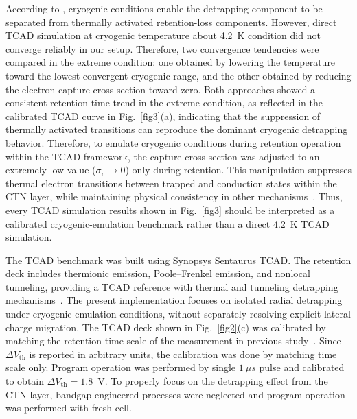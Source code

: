 \documentclass[journal,twoside,web]{ieeecolor}
\begin{document}
According to \cite{Refaldi.IRPS2025}, cryogenic conditions enable the detrapping component to be {separated from thermally activated retention-loss components}.
However, direct TCAD simulation at cryogenic temperature about 4.2~K condition did not converge reliably in our setup.
{Therefore, two convergence tendencies were compared in the extreme condition: one obtained by lowering the temperature toward the lowest convergent cryogenic range, and the other obtained by reducing the electron capture cross section toward zero.}
{Both approaches showed a consistent retention-time trend in the extreme condition, as reflected in the calibrated TCAD curve in Fig.~\ref{fig3}(a), indicating that the suppression of thermally activated transitions can reproduce the dominant cryogenic detrapping behavior.}
Therefore, to emulate cryogenic conditions during retention operation within the TCAD framework, the capture cross section was adjusted to an extremely low value ($\sigma_\mathrm{n} \rightarrow 0$) only during retention.
This manipulation suppresses thermal electron transitions between trapped and conduction states within the CTN layer, while maintaining physical consistency in other mechanisms~\cite{TCADmanual.2022}.
{Thus, every TCAD simulation results shown in \hbox{Fig.~\ref{fig3}} should be interpreted as a calibrated cryogenic-emulation benchmark rather than a direct 4.2~K TCAD simulation.}

{The TCAD benchmark was built using Synopsys Sentaurus TCAD.}
{The retention deck includes thermionic emission, Poole--Frenkel emission, and nonlocal tunneling, providing a TCAD reference with thermal and tunneling detrapping mechanisms~\hbox{\cite{TCADmanual.2022}}.}
{The present implementation focuses on isolated radial detrapping under cryogenic-emulation conditions, without separately resolving explicit lateral charge migration.}
The TCAD deck shown in Fig.~\ref{fig2}(c) was calibrated by matching the retention time scale of the measurement in previous study~\cite{Refaldi.IRPS2025}.
Since $\Delta V_\text{th}$ is reported in arbitrary units, the calibration was done by matching time scale only.
Program operation was performed by single $1~\mu s$ pulse and calibrated to obtain $\Delta V_\text{th} = 1.8$~V.
To properly focus on the detrapping effect from the CTN layer, bandgap-engineered processes were neglected and program operation was performed with fresh cell.
\end{document}
